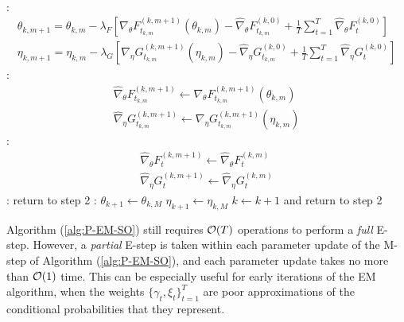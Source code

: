 \begin{algorithm}
\begin{algorithmic}[1]
\begin{gather}
        \end{gather}
    :
        \begin{gather}
            \theta_{k,m+1} = \theta_{k,m} - \lambda_F \left[\nabla_\theta F_{t_{k,m}}^{(k,m+1)}(\theta_{k,m}) - \widehat \nabla_\theta F_{t_{k,m}}^{(k,0)} + \frac{1}{T} \sum_{t=1}^T \widehat \nabla_\theta F^{(k,0)}_{t} \right] \\
            \eta_{k,m+1} = \eta_{k,m} - \lambda_G \left[\nabla_\eta G_{t_{k,m}}^{(k,m+1)}(\eta_{k,m}) - \widehat \nabla_\eta G_{t_{k,m}}^{(k,0)} + \frac{1}{T} \sum_{t=1}^T \widehat \nabla_\eta G^{(k,0)}_{t} \right]
        \end{gather}
    \EndIf
    :
        \begin{gather}
            \widehat \nabla_\theta F_{t_{k,m}}^{(k,m+1)} \gets \nabla_\theta F_{t_{k,m}}^{(k,m+1)}(\theta_{k,m}) \\
            \widehat \nabla_\eta G_{t_{k,m}}^{(k,m+1)} \gets \nabla_\eta G_{t_{k,m}}^{(k,m+1)}(\eta_{k,m})
        \end{gather}
        :
            \begin{gather}
                \widehat \nabla_\theta F_{t}^{(k,m+1)} \gets \widehat \nabla_\theta F_{t}^{(k,m)} \\
                \widehat \nabla_\eta G_{t}^{(k,m+1)} \gets \widehat \nabla_\eta G_{t}^{(k,m)}
            \end{gather}
        \EndFor
    \EndIf
\EndFor
%
:
    \State return to step 2 
\Else:
    \State $\theta_{k+1} \gets \theta_{k,M}$
    \State $\eta_{k+1} \gets \eta_{k,M}$
    \State $k \gets k+1$ and return to step 2
\EndIf
\end{algorithmic}
\end{algorithm}

Algorithm (\ref{alg:P-EM-SO}) still requires $\mathcal{O}(T)$ operations to perform a \textit{full} E-step. However, a \textit{partial} E-step is taken within each parameter update of the M-step of Algorithm (\ref{alg:P-EM-SO}), and each parameter update takes no more than $\mathcal{O}(1)$ time. This can be especially useful for early iterations of the EM algorithm, when the weights $\{\gamma_t,\xi_t\}_{t=1}^T$ are poor approximations of the conditional probabilities that they represent.

